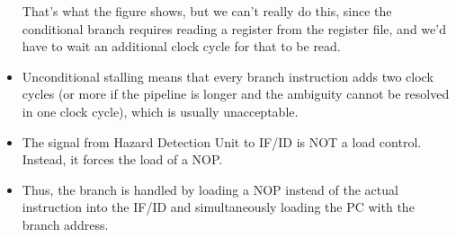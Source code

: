 \begin{frame}[fragile]
\begin{itemize}
  That's what the figure shows, but we can't really do this, since the
  conditional branch requires reading a register from the register file,
  and we'd have to wait an additional clock cycle for that to be read.
\item
Unconditional stalling means that every branch instruction adds two
clock cycles (or more if the pipeline is longer and the ambiguity
cannot be resolved in one clock cycle), which is usually unacceptable.
\end{itemize}
\fi\ENotes
\end{frame}

\newpage
\begin{frame}[fragile]

\BNotes\ifnum{}
\begin{itemize}
	\item The signal from Hazard Detection Unit to IF/ID is NOT a 
		load control.  Instead, it forces the load of a NOP.
	\item Thus, the branch is handled by loading a NOP instead of
		the actual instruction into the IF/ID and simultaneously
		loading the PC with the branch address.
\end{itemize}
\fi\ENotes
\end{frame}


